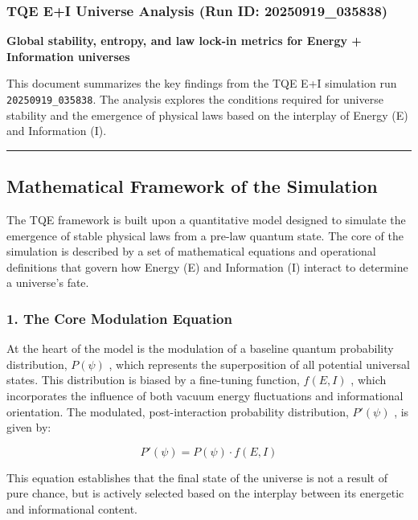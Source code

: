 \subsubsection{TQE E+I Universe Analysis (Run ID:
20250919\_035838)}\label{tqe-ei-universe-analysis-run-id-20250919_035838}

\textbf{Global stability, entropy, and law lock-in metrics for Energy +
Information universes}

This document summarizes the key findings from the TQE E+I simulation
run \texttt{20250919\_035838}. The analysis explores the conditions
required for universe stability and the emergence of physical laws based
on the interplay of Energy (E) and Information (I).

\begin{center}\rule{0.5\linewidth}{0.5pt}\end{center}

\subsection{Mathematical Framework of the
Simulation}\label{mathematical-framework-of-the-simulation}

The TQE framework is built upon a quantitative model designed to
simulate the emergence of stable physical laws from a pre-law quantum
state. The core of the simulation is described by a set of mathematical
equations and operational definitions that govern how Energy (E) and
Information (I) interact to determine a universe's fate.

\subsubsection{1. The Core Modulation
Equation}\label{the-core-modulation-equation}

At the heart of the model is the modulation of a baseline quantum
probability distribution, \(P(ψ)\) , which represents the superposition
of all potential universal states. This distribution is biased by a
fine-tuning function, \(f(E,I)\) , which incorporates the influence of
both vacuum energy fluctuations and informational orientation. The
modulated, post-interaction probability distribution, \(P′(ψ)\) , is
given by:

\[
P′(ψ)=P(ψ)⋅f(E,I)
\]

This equation establishes that the final state of the universe is not a
result of pure chance, but is actively selected based on the interplay
between its energetic and informational content.

